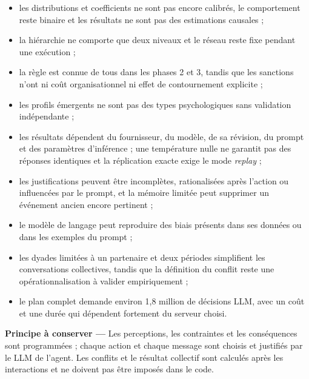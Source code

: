 \documentclass[10pt,a4paper]{article}
\begin{document}
\begin{itemize}
  \item les distributions et coefficients ne sont pas encore calibrés, le
  comportement reste binaire et les résultats ne sont pas des estimations
  causales ;
  \item la hiérarchie ne comporte que deux niveaux et le réseau reste fixe
  pendant une exécution ;
  \item la règle est connue de tous dans les phases 2 et 3, tandis que les
  sanctions n’ont ni coût organisationnel ni effet de contournement explicite ;
  \item les profils émergents ne sont pas des types psychologiques sans
  validation indépendante ;
  \item les résultats dépendent du fournisseur, du modèle, de sa révision, du
  prompt et des paramètres d’inférence ; une température nulle ne garantit pas
  des réponses identiques et la réplication exacte exige le mode
  \emph{replay} ;
  \item les justifications peuvent être incomplètes, rationalisées après
  l’action ou influencées par le prompt, et la mémoire limitée peut supprimer
  un événement ancien encore pertinent ;
  \item le modèle de langage peut reproduire des biais présents dans ses
  données ou dans les exemples du prompt ;
  \item les dyades limitées à un partenaire et deux périodes simplifient les
  conversations collectives, tandis que la définition du conflit reste une
  opérationnalisation à valider empiriquement ;
  \item le plan complet demande environ 1,8 million de décisions LLM, avec un
  coût et une durée qui dépendent fortement du serveur choisi.
\end{itemize}

\medskip
\noindent\textbf{\color{Navy}Principe à conserver —}
Les perceptions, les contraintes et les conséquences sont programmées ; chaque
action et chaque message sont choisis et justifiés par le LLM de l’agent. Les
conflits et le résultat collectif sont calculés après les interactions et ne
doivent pas être imposés dans le code.
\end{document}
